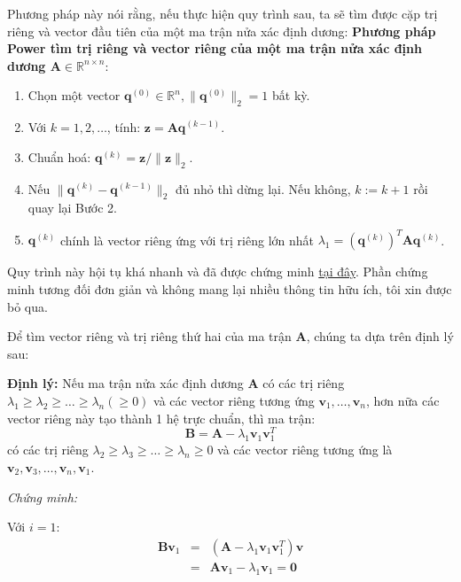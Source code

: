 Phương pháp này nói rằng, nếu thực hiện quy trình sau, ta sẽ tìm được cặp trị riêng và vector đầu tiên của một ma trận nửa xác định dương: 
\textbf{Phương pháp Power tìm trị riêng và vector riêng của một ma trận nửa xác định dương $\mathbf{A} \in \mathbb{R}^{n \times n}$}: 
\begin{enumerate}
  \item Chọn một vector $\mathbf{q}^{(0)} \in \mathbb{R}^n, \|\mathbf{q}^{(0)}\|_2 = 1$ bất kỳ. 
  \item Với $k = 1, 2, \dots$, tính: $\mathbf{z} = \mathbf{Aq}^{(k-1)}$. 
  \item Chuẩn hoá: $\mathbf{q}^{(k)} = \mathbf{z} / \|\mathbf{z}\|_2$. 
  \item Nếu $\|\mathbf{q}^{(k)} - \mathbf{q}^{(k-1)}\|_2$ đủ nhỏ thì dừng lại. Nếu không, $k := k + 1$ rồi quay lại Bước 2. 
  \item $\mathbf{q}^{(k)}$ chính là vector riêng ứng với trị riêng lớn nhất $\lambda_1 = (\mathbf{q}^{(k)})^T\mathbf{A}\mathbf{q}^{(k)}$. 
\end{enumerate}
 
Quy trình này hội tụ khá nhanh và đã được chứng minh \href{http://www.cs.huji.ac.il/~csip/tirgul2.pdf}{tại đây}. Phần chứng minh tương đối đơn giản và không mang lại nhiều thông tin hữu ích, tôi xin được bỏ qua. 
 
Để tìm vector riêng và trị riêng thứ hai của ma trận $\mathbf{A}$, chúng ta dựa trên định lý sau: 

\textbf{Định lý:} Nếu ma trận nửa xác định dương $\mathbf{A}$ có các trị riêng $\lambda_1 \geq \lambda_2 \geq \dots \geq \lambda_n ( \geq 0)$ và các vector riêng tương ứng $\mathbf{v}_1, \dots, \mathbf{v}_n$, hơn nữa các vector riêng này tạo thành 1 hệ trực chuẩn, thì ma trận: 
\begin{equation} 
  \mathbf{B} = \mathbf{A} - \lambda_1 \mathbf{v}_1 \mathbf{v}_1^T 
\end{equation} 
có các trị riêng $\lambda_2 \geq \lambda_3 \geq \dots \geq \lambda_n \geq 0$ và các vector riêng tương ứng là $\mathbf{v}_2, \mathbf{v}_3, \dots, \mathbf{v}_n, \mathbf{v}_1$. 

\textit{Chứng minh: }
 
Với $i = 1$: 
\begin{eqnarray} 
  \mathbf{Bv}_1 &=& (\mathbf{A} - \lambda_1 \mathbf{v}_1 \mathbf{v}_1^T) \mathbf{v} \\\
  &= & \mathbf{Av}_1 - \lambda_1 \mathbf{v}_1 = \mathbf{0} \\\ 
\end{eqnarray} 
 
